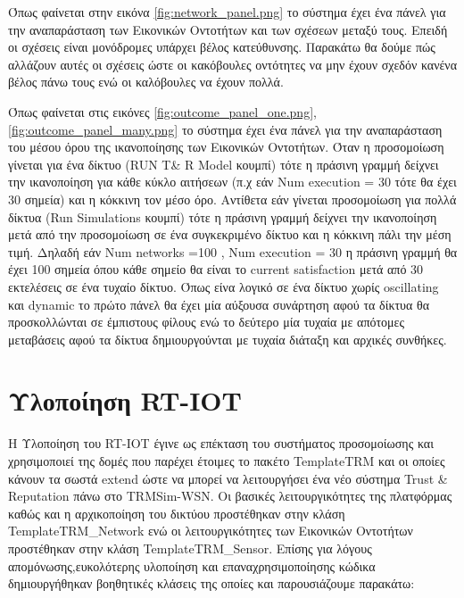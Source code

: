Όπως φαίνεται στην εικόνα \ref{fig:network_panel.png} το σύστημα έχει ένα πάνελ για την αναπαράσταση των Εικονικών Οντοτήτων και των σχέσεων μεταξύ τους. Επειδή οι σχέσεις είναι μονόδρομες υπάρχει βέλος κατεύθυνσης. Παρακάτω θα δούμε πώς αλλάζουν αυτές οι σχέσεις ώστε οι κακόβουλες οντότητες να μην έχουν σχεδόν κανένα βέλος πάνω τους ενώ οι καλόβουλες να έχουν πολλά.

\newpage
Όπως φαίνεται στις εικόνες \ref{fig:outcome_panel_one.png}, \ref{fig:outcome_panel_many.png} το σύστημα έχει ένα πάνελ για την αναπαράσταση του μέσου όρου της ικανοποίησης των Εικονικών Οντοτήτων. Όταν η προσομοίωση γίνεται για ένα δίκτυο (RUN T\& R Model κουμπί) τότε η πράσινη γραμμή δείχνει την ικανοποίηση για κάθε κύκλο αιτήσεων (π.χ εάν Num execution = 30 τότε θα έχει 30 σημεία) και η κόκκινη τον μέσο όρο. Αντίθετα εάν γίνεται προσομοίωση για πολλά δίκτυα (Run Simulations κουμπί) τότε η πράσινη γραμμή δείχνει την ικανοποίηση μετά από την προσομοίωση σε ένα συγκεκριμένο δίκτυο και η κόκκινη πάλι την μέση τιμή. Δηλαδή εάν Num networks =100 , Num execution = 30 η πράσινη γραμμή θα έχει 100 σημεία όπου κάθε σημείο θα είναι το current satisfaction μετά από 30 εκτελέσεις σε ένα τυχαίο δίκτυο. Όπως είνα λογικό σε ένα δίκτυο χωρίς oscillating και dynamic το πρώτο πάνελ θα έχει μία αύξουσα συνάρτηση αφού τα δίκτυα θα προσκολλώνται σε έμπιστους φίλους ενώ το δεύτερο μία τυχαία με απότομες μεταβάσεις αφού τα δίκτυα δημιουργούνται με τυχαία διάταξη και αρχικές συνθήκες.



\newpage
\section{Υλοποίηση RT-IOT}

Η Υλοποίηση του RT-IOT έγινε ως επέκταση του συστήματος προσομοίωσης και χρησιμοποιεί της δομές που παρέχει έτοιμες  το πακέτο TemplateTRM 
και οι οποίες κάνουν τα σωστά extend ώστε να μπορεί να λειτουργήσει ένα νέο σύστημα Trust \& Reputation πάνω στο TRMSim-WSN.
 Οι βασικές λειτουργικότητες της πλατφόρμας καθώς και η αρχικοποίηση του δικτύου προστέθηκαν στην κλάση TemplateTRM\_Network 
 ενώ οι λειτουργικότητες των Εικονικών Οντοτήτων προστέθηκαν στην κλάση TemplateTRM\_Sensor. 
 Επίσης για λόγους απομόνωσης,ευκολότερης υλοποίηση και επαναχρησιμοποίησης κώδικα δημιουργήθηκαν βοηθητικές κλάσεις της οποίες και παρουσιάζουμε παρακάτω:

